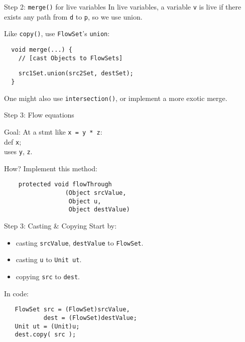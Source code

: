 \begin{slide}{Step 2: {\tt merge()} for live variables}
In live variables, a variable {\tt v} is live if there exists {\red any} path
from {\tt d} to {\tt p}, so we use {\red union}.

\qquad

Like {\tt copy()}, use {\tt FlowSet}'s {\tt union}:

\vspace*{0.05in}

\begin{verbatim}
  void merge(...) {
    // [cast Objects to FlowSets]
\end{verbatim}
{\red\verb+    src1Set.union(src2Set, destSet);+}\\
\verb+  }+

\vspace*{0.1in}

One might also use {\tt intersection()}, or implement a more exotic merge.

\end{slide}

\begin{slide}{Step 3: Flow equations}
\vspace*{-0.1in}

Goal: At a stmt like {\tt x = y * z}:\\
\qquad \qquad {\red -- } def {\tt x};\\
\qquad \qquad {\red + } uses {\tt y}, {\tt z}.

\vspace*{0.1in}

How? Implement this method:
\begin{verbatim}
    protected void flowThrough
                 (Object srcValue, 
                  Object u, 
                  Object destValue)
\end{verbatim}
\end{slide}

\begin{slide}{Step 3: Casting \& Copying}
Start by:
\begin{itemize}
\item casting {\tt srcValue}, {\tt destValue} to {\tt FlowSet}.

\item casting {\tt u} to {\tt Unit ut}.

\item copying {\tt src} to {\tt dest}.
\end{itemize}

In code:

\begin{verbatim}
   FlowSet src = (FlowSet)srcValue,
           dest = (FlowSet)destValue;
   Unit ut = (Unit)u;
   dest.copy( src );
\end{verbatim}
\end{slide}

